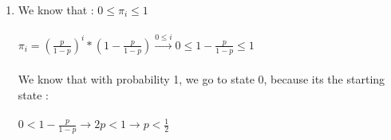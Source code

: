\begin{enumerate}
\begin{latin}
 \end{latin}
 \item \phantom{text}
  \begin{latin}
    \noindent
    We know that : $0\leq\pi_i\leq1$\\\\
    $\pi_i = (\frac{p}{1-p})^i * (1 - \frac{p}{1-p})\xrightarrow[]{0 \leq i} 0 \leq 1 - \frac{p}{1-p} \leq 1$ \\\\
    We know that with probability 1, we go to state 0, because its the starting state : \\\\
    $0 < 1 - \frac{p}{1-p} \rightarrow 2p < 1 \rightarrow p < \frac{1}{2}$
  
 \end{latin}
\end{enumerate}
